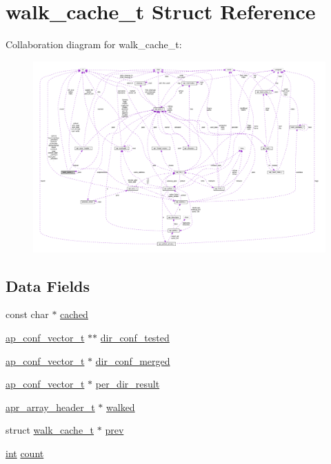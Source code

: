 \hypertarget{structwalk__cache__t}{}\section{walk\+\_\+cache\+\_\+t Struct Reference}
\label{structwalk__cache__t}


Collaboration diagram for walk\+\_\+cache\+\_\+t\+:
\nopagebreak
\begin{figure}[H]
\begin{center}
\leavevmode
\includegraphics[width=350pt]{structwalk__cache__t__coll__graph}
\end{center}
\end{figure}
\subsection*{Data Fields}
\begin{DoxyCompactItemize}
\item 
const char $\ast$ \hyperlink{structwalk__cache__t_a9abcbfef85e91bd8884466ed1ae5e458}{cached}
\item 
\hyperlink{group__APACHE__CORE__CONFIG_ga614684670dbf748a70ac6bad272da59c}{ap\+\_\+conf\+\_\+vector\+\_\+t} $\ast$$\ast$ \hyperlink{structwalk__cache__t_a7396abea1367b169eee1f50b98228d16}{dir\+\_\+conf\+\_\+tested}
\item 
\hyperlink{group__APACHE__CORE__CONFIG_ga614684670dbf748a70ac6bad272da59c}{ap\+\_\+conf\+\_\+vector\+\_\+t} $\ast$ \hyperlink{structwalk__cache__t_ab6baec662bbf64b6f25761cd09343072}{dir\+\_\+conf\+\_\+merged}
\item 
\hyperlink{group__APACHE__CORE__CONFIG_ga614684670dbf748a70ac6bad272da59c}{ap\+\_\+conf\+\_\+vector\+\_\+t} $\ast$ \hyperlink{structwalk__cache__t_a9ef6aa0ee43e451121debf55a70bf37b}{per\+\_\+dir\+\_\+result}
\item 
\hyperlink{structapr__array__header__t}{apr\+\_\+array\+\_\+header\+\_\+t} $\ast$ \hyperlink{structwalk__cache__t_a8c82bac2e2820f9f2b2f20199554d371}{walked}
\item 
struct \hyperlink{structwalk__cache__t}{walk\+\_\+cache\+\_\+t} $\ast$ \hyperlink{structwalk__cache__t_a8c7c317890be19f71214d791894d574a}{prev}
\item 
\hyperlink{pcre_8txt_a42dfa4ff673c82d8efe7144098fbc198}{int} \hyperlink{structwalk__cache__t_a4140c5004448e528dbafb7da5626cf67}{count}
\end{DoxyCompactItemize}


